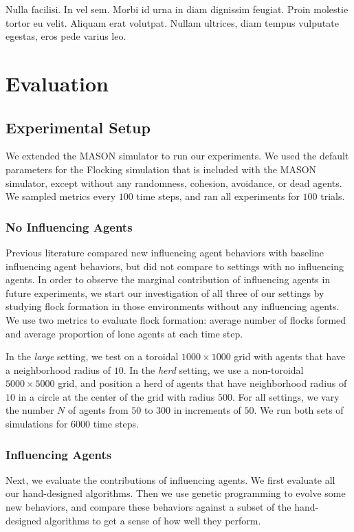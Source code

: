 \begin{savequote}[75mm]
Nulla facilisi. In vel sem. Morbi id urna in diam dignissim feugiat. Proin molestie tortor eu velit. Aliquam erat volutpat. Nullam ultrices, diam tempus vulputate egestas, eros pede varius leo.
\end{savequote}

\chapter{Evaluation}
\label{ch:evaluation}

\section{Experimental Setup}

We extended the MASON simulator to run our experiments.\cite{luke05mason}
We used the default parameters for the Flocking simulation that is included
with the MASON simulator, except without any randomness, cohesion, avoidance,
or dead agents.
We sampled metrics every $100$ time steps, and ran all experiments for $100$
trials.

\subsection{No Influencing Agents}
Previous literature compared new influencing agent behaviors with baseline
influencing agent behaviors, but did not compare to settings with no
influencing agents.
In order to observe the marginal contribution of influencing agents
in future experiments, we start our investigation of all three of our settings
by studying flock formation in those environments without any influencing
agents.
We use two metrics to evaluate flock formation: average number of flocks
formed and average proportion of lone agents at each time step.

In the \textit{large} setting, we test on a toroidal $1000\times1000$ grid with
agents that have a neighborhood radius of $10$.
In the \textit{herd} setting, we use a non-toroidal $5000\times5000$ grid, and
position a herd of agents that have neighborhood radius of $10$ in a circle at
the center of the grid with radius $500$.
For all settings, we vary the number $N$ of agents from $50$ to $300$ in
increments of $50$.
We run both sets of simulations for $6000$ time steps.

\subsection{Influencing Agents}
Next, we evaluate the contributions of influencing agents.
We first evaluate all our hand-designed algorithms.
Then we use genetic programming to evolve some new behaviors, and compare these
behaviors against a subset of the hand-designed algorithms to get a sense of
how well they perform.

